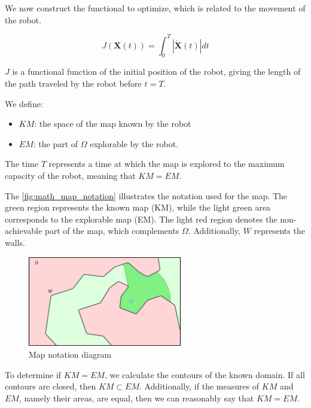 \documentclass[../main.tex]{subfiles}
\begin{document}
We now construct the functional to optimize, which is related to the movement of the robot.
\vspace{0.5em}

\begin{equation}
	\displaystyle
	J(\mathbf{X}(t)) = \int_{0}^{T} | \mathbf{\dot{X}}(t) | dt
\end{equation}
\vspace{0.5em}

$J$ is a functional function of the initial position of the robot, giving the length of the path traveled by the robot before $t = T$.
\vspace{0.5em}

We define:
\begin{itemize}
	\item $\mathit{KM}$: the space of the map known by the robot
	\item $\mathit{EM}$: the part of $\Omega$ explorable by the robot.
\end{itemize}

The time $T$ represents a time at which the map is explored to the maximum capacity of the robot, meaning that $KM = EM$.

\vspace{0.5em}

The \autoref{fig:math_map_notation} illustrates the notation used for the map. The green region represents the known map (KM), while the light green area corresponds to the explorable map (EM). The light red region denotes the non-achievable part of the map, which complements $\Omega$. Additionally, $W$ represents the walls.
\begin{figure}[H]
	\centering
	\includegraphics[width=0.6\textwidth]{IMAGES/part3/math_map_nota.png}
	\caption{Map notation diagram}
	\label{fig:math_map_notation}
\end{figure}

\vspace{0.5em}

To determine if $KM = EM$, we calculate the contours of the known domain. If all contours are closed, then $KM \subset EM$. Additionally, if the measures of $KM$ and $EM$, namely their areas, are equal, then we can reasonably say that $KM = EM$.
\end{document}
